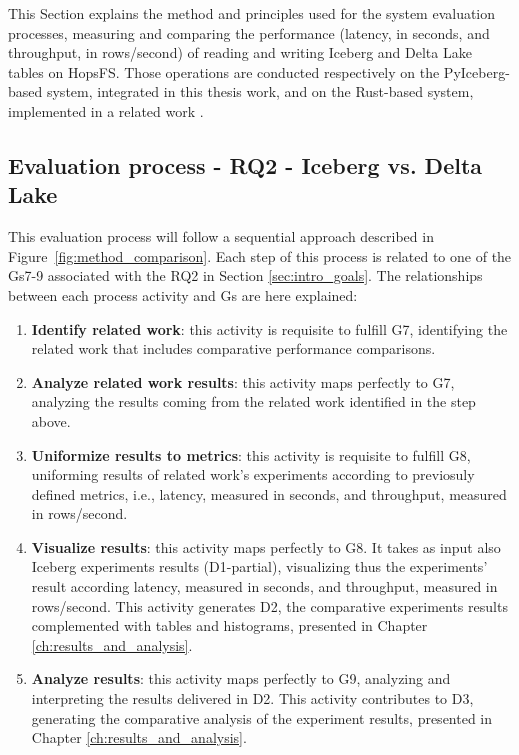 This Section explains the method and principles used for the system evaluation processes, measuring and comparing the performance (latency, in seconds, and throughput, in rows/second) of reading and writing Iceberg and Delta Lake tables on \gls{HopsFS}. Those operations are conducted respectively on the PyIceberg-based system, integrated in this thesis work, and on the Rust-based system, implemented in a related work \cite{manfrediReducingReadWrite2024}.

\subsection{Evaluation process - RQ2 - Iceberg vs. Delta Lake}
\label{subsec:eval_process_iceberg_delta}
This evaluation process will follow a sequential approach described in Figure~\ref{fig:method_comparison}. Each step of this process is related to one of the \glspl{G}7-9 associated with the \gls{RQ}2 in Section \ref{sec:intro_goals}. The relationships between each process activity and \glspl{G} are here explained:
\begin{enumerate}
    \item \textbf{Identify related work}: this activity is requisite to fulfill \gls{G}7, identifying the related work that includes comparative performance comparisons.
    \item \textbf{Analyze related work results}: this activity maps perfectly to \gls{G}7, analyzing the results coming from the related work identified in the step above.
    \item \textbf{Uniformize results to metrics}: this activity is requisite to fulfill \gls{G}8, uniforming results of related work's experiments according to previosuly defined metrics, i.e., latency, measured in seconds, and throughput, measured  in rows/second.
    \item \textbf{Visualize results}: this activity maps perfectly to \gls{G}8. It takes as input also Iceberg experiments results (\gls{D}1-partial), visualizing thus the experiments' result according latency, measured in seconds, and throughput, measured in rows/second. This activity generates \gls{D}2, the comparative experiments results complemented with tables and histograms, presented in Chapter \ref{ch:results_and_analysis}.
    \item \textbf{Analyze results}: this activity maps perfectly to \gls{G}9, analyzing and interpreting the results delivered in \gls{D}2. This activity contributes to \gls{D}3, generating the comparative analysis of the experiment results, presented in Chapter \ref{ch:results_and_analysis}.
\end{enumerate}

